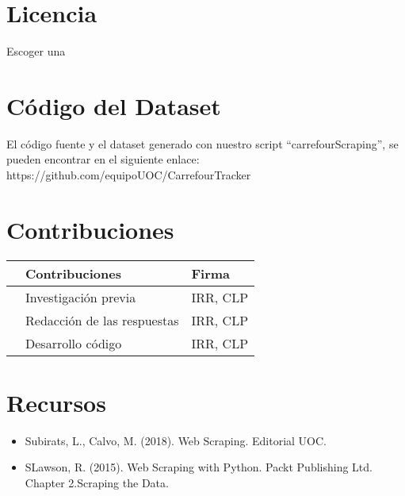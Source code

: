 \documentclass{article}
\begin{document}
\section{Licencia}
Escoger una

\section{Código del Dataset}
El código fuente y el dataset generado con nuestro script “carrefourScraping”, se pueden encontrar en el siguiente enlace: https://github.com/equipoUOC/CarrefourTracker

\section{Contribuciones}

\begin{table}
    \centering
    \begin{tabular}{rll}
    & Contribuciones & Firma \\
    \hline
    & Investigación previa & IRR, CLP  \\
    & Redacción de las respuestas & IRR, CLP \\
    & Desarrollo código & IRR, CLP \\
    \end{tabular}
\end{table}

\section{Recursos}
\begin{itemize}
    \item Subirats, L., Calvo, M. (2018). Web Scraping. Editorial UOC.
    \item SLawson, R. (2015). Web Scraping with Python. Packt Publishing Ltd. Chapter 2.Scraping the Data.

\end{itemize}
\end{document}
